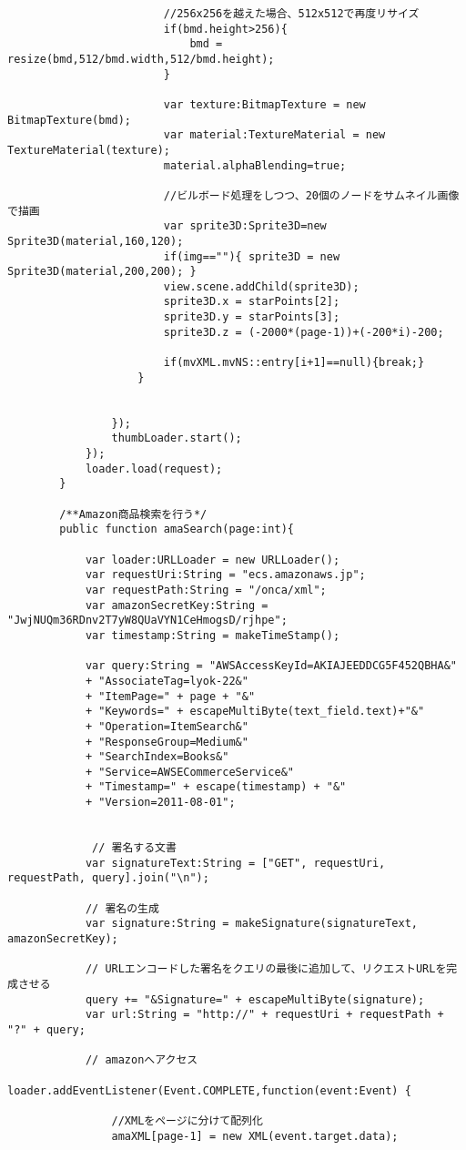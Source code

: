 {\begin{verbatim}
						//256x256を越えた場合、512x512で再度リサイズ
						if(bmd.height>256){
							bmd = resize(bmd,512/bmd.width,512/bmd.height);
						}
						
						var texture:BitmapTexture = new BitmapTexture(bmd);
						var material:TextureMaterial = new TextureMaterial(texture);
						material.alphaBlending=true;
						
						//ビルボード処理をしつつ、20個のノードをサムネイル画像で描画
						var sprite3D:Sprite3D=new Sprite3D(material,160,120);
						if(img==""){ sprite3D = new Sprite3D(material,200,200); }
						view.scene.addChild(sprite3D);
						sprite3D.x = starPoints[2];
						sprite3D.y = starPoints[3];
						sprite3D.z = (-2000*(page-1))+(-200*i)-200;
						
						if(mvXML.mvNS::entry[i+1]==null){break;}
					}
					
					
				});
				thumbLoader.start();
			});
			loader.load(request);
		}
		
		/**Amazon商品検索を行う*/
		public function amaSearch(page:int){
			
			var loader:URLLoader = new URLLoader();
			var requestUri:String = "ecs.amazonaws.jp";
			var requestPath:String = "/onca/xml";
			var amazonSecretKey:String = "JwjNUQm36RDnv2T7yW8QUaVYN1CeHmogsD/rjhpe";
			var timestamp:String = makeTimeStamp();
			
			var query:String = "AWSAccessKeyId=AKIAJEEDDCG5F452QBHA&"
			+ "AssociateTag=lyok-22&"
			+ "ItemPage=" + page + "&"
			+ "Keywords=" + escapeMultiByte(text_field.text)+"&"
			+ "Operation=ItemSearch&"
			+ "ResponseGroup=Medium&"
			+ "SearchIndex=Books&"
			+ "Service=AWSECommerceService&"
			+ "Timestamp=" + escape(timestamp) + "&"
			+ "Version=2011-08-01";
			
			
			 // 署名する文書
			var signatureText:String = ["GET", requestUri, requestPath, query].join("\n");
			
			// 署名の生成
			var signature:String = makeSignature(signatureText, amazonSecretKey);
			
			// URLエンコードした署名をクエリの最後に追加して、リクエストURLを完成させる
			query += "&Signature=" + escapeMultiByte(signature);
			var url:String = "http://" + requestUri + requestPath + "?" + query;
			
			// amazonへアクセス
			loader.addEventListener(Event.COMPLETE,function(event:Event) {
									
				//XMLをページに分けて配列化
				amaXML[page-1] = new XML(event.target.data);
				

\end{verbatim}}
